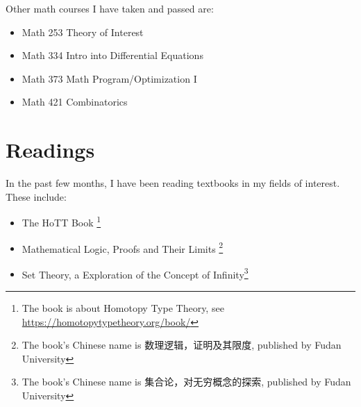 \documentclass[11pt]{article}
\begin{document}
    Other math courses I have taken and passed are:

    \begin{itemize}
        \item Math 253 Theory of Interest
        \item Math 334 Intro into Differential Equations
        \item Math 373 Math Program/Optimization I
        \item Math 421 Combinatorics
    \end{itemize}

    \section*{Readings}

    In the past few months, I have been reading textbooks in my fields of interest.
    These include:

    \begin{itemize}
        \item The HoTT Book \footnote{The book is about Homotopy Type Theory, see \url{https://homotopytypetheory.org/book/}}
        \item Mathematical Logic, Proofs and Their Limits \footnote{The book's Chinese name is 数理逻辑，证明及其限度, published by Fudan University}
        \item Set Theory, a Exploration of the Concept of Infinity\footnote{The book's Chinese name is 集合论，对无穷概念的探索, published by Fudan University}
    \end{itemize}
\end{document}
